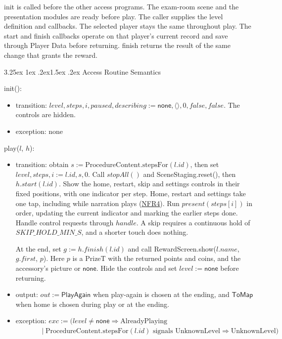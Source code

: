 \documentclass[10pt, titlepage]{article}
\makeatletter
\newcommand{\srsurl}{https://team-hindsight.github.io/ophthamology-game/SRS/SRS.pdf}
\newcommand{\srsitemref}[2]{\href{\srsurl\#nameddest=#1}{#2}}
\renewcommand\paragraph{\@startsection{paragraph}{4}{\z@}%
  {3.25ex \@plus 1ex \@minus .2ex}{1.5ex \@plus .2ex}%
  {\normalfont\normalsize\bfseries}}
\newcommand{\T}[1]{\mathit{#1}}          %
\newcommand{\V}[1]{\mathsf{#1}}          %
\newcommand{\out}{\mathit{out}}
\newcommand{\exc}{\mathit{exc}}
\newcommand{\false}{\mathit{false}}
\makeatother
\begin{document}
init is called before the other access programs. The exam-room scene and
the presentation modules are ready before play. The caller supplies the
level definition and callbacks. The selected player stays the
same throughout play. The start and finish callbacks operate on that
player's current record and save through Player Data before returning.
finish returns the result of the same change that grants the reward.

\paragraph{Access Routine Semantics}

\begin{samepage}
\noindent init():
\begin{itemize}
\item transition: $\T{level}, \T{steps}, i, \T{paused}, \T{describing} :=
  \V{none}, \langle\rangle, 0, \false, \false$. The controls are hidden.
\item exception: none
\end{itemize}
\end{samepage}
\par\pagebreak[0]

\begin{samepage}
\noindent play($l$, $h$):
\begin{itemize}
\item transition: obtain $s := \text{ProcedureContent.stepsFor}(l.\T{id})$,
  then set $\T{level}, \T{steps}, i := l.\T{id}, s, 0$.
  Call $\T{stopAll}()$ and SceneStaging.reset(), then
  $h.\T{start}(l.\T{id})$. Show the home, restart, skip and settings
  controls in their fixed positions, with one indicator per step.
  Home, restart and settings take one tap, including while narration
  plays (\srsitemref{NFR_Exit}{NFR4}).
  Run $\T{present}(\T{steps}[i])$ in order, updating the current
  indicator and marking the earlier steps done. Handle control requests through
  $\T{handle}$. A skip requires a continuous hold of
  $\T{SKIP\_HOLD\_MIN\_S}$, and a shorter touch does nothing.

  At the end, set $g := h.\T{finish}(l.\T{id})$ and call
  RewardScreen.show($l.\T{name}$, $g.\T{first}$, $p$). Here $p$ is a
  PrizeT with the returned points and coins, and the accessory's picture
  or $\V{none}$. Hide the controls and set $\T{level} := \V{none}$
  before returning.
\item output: $\out := \V{PlayAgain}$ when play-again is chosen at
  the ending, and $\V{ToMap}$ when home is chosen during play or at
  the ending.
\item exception: $\exc := (\T{level} \neq \V{none} \Rightarrow
  \text{AlreadyPlaying}$\\
  $\phantom{\exc := (}\mid \text{ProcedureContent.stepsFor}(l.\T{id})
  \text{ signals UnknownLevel} \Rightarrow \text{UnknownLevel})$
\end{itemize}
\end{samepage}
\par\pagebreak[0]
\end{document}
